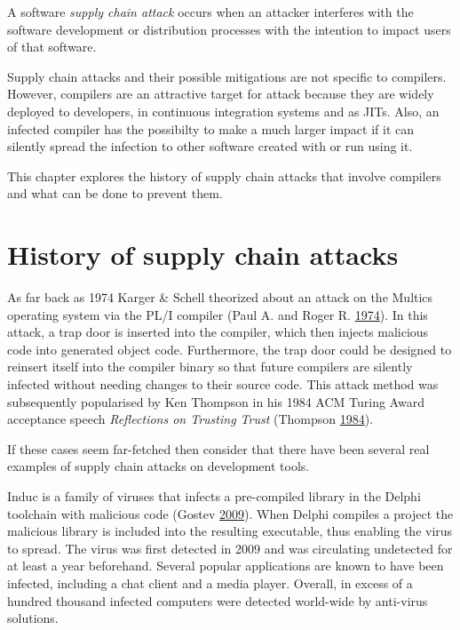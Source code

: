 \documentclass[a4paper,]{report}
\begin{document}
A software \emph{supply chain attack} occurs when an attacker interferes
with the software development or distribution processes with the
intention to impact users of that software.

Supply chain attacks and their possible mitigations are not specific to
compilers. However, compilers are an attractive target for attack
because they are widely deployed to developers, in continuous
integration systems and as JITs. Also, an infected compiler has the
possibilty to make a much larger impact if it can silently spread the
infection to other software created with or run using it.

This chapter explores the history of supply chain attacks that involve
compilers and what can be done to prevent them.

\hypertarget{history-of-supply-chain-attacks}{%
\section{History of supply chain
attacks}\label{history-of-supply-chain-attacks}}

As far back as 1974 Karger \& Schell theorized about an attack on the
Multics operating system via the PL/I compiler (Paul A. and Roger R.
\protect\hyperlink{ref-Karger1974}{1974}). In this attack, a trap door
is inserted into the compiler, which then injects malicious code into
generated object code. Furthermore, the trap door could be designed to
reinsert itself into the compiler binary so that future compilers are
silently infected without needing changes to their source code. This
attack method was subsequently popularised by Ken Thompson in his 1984
ACM Turing Award acceptance speech \emph{Reflections on Trusting Trust}
(Thompson \protect\hyperlink{ref-Thompson1984}{1984}).

If these cases seem far-fetched then consider that there have been
several real examples of supply chain attacks on development tools.

Induc is a family of viruses that infects a pre-compiled library in the
Delphi toolchain with malicious code (Gostev
\protect\hyperlink{ref-Gostev2009}{2009}). When Delphi compiles a
project the malicious library is included into the resulting executable,
thus enabling the virus to spread. The virus was first detected in 2009
and was circulating undetected for at least a year beforehand. Several
popular applications are known to have been infected, including a chat
client and a media player. Overall, in excess of a hundred thousand
infected computers were detected world-wide by anti-virus solutions.
\end{document}
